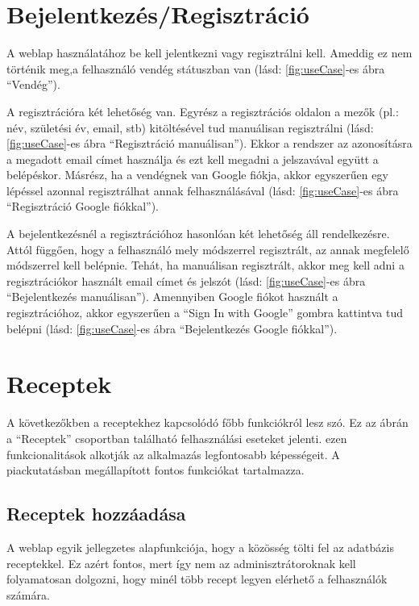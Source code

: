 \documentclass[12pt]{report}
\theoremstyle{definition}
\begin{document}
\section{Bejelentkezés/Regisztráció}
A weblap használatához be kell jelentkezni vagy regisztrálni kell. Ameddig ez nem történik meg,a felhasználó vendég státuszban van (lásd: \ref{fig:useCase}-es ábra “Vendég”). 

A regisztrációra két lehetőség van. Egyrész a regisztrációs oldalon a mezők (pl.: név, születési év, email, stb) kitöltésével tud manuálisan regisztrálni (lásd: \ref{fig:useCase}-es ábra “Regisztráció manuálisan”). Ekkor a rendszer az azonosításra a megadott email címet használja és ezt kell megadni a jelszavával együtt a belépéskor. Másrész, ha a vendégnek van Google fiókja, akkor egyszerűen egy lépéssel azonnal regisztrálhat annak felhasználásával (lásd: \ref{fig:useCase}-es ábra “Regisztráció Google fiókkal”).

A bejelentkezésnél a regisztrációhoz hasonlóan két lehetőség áll rendelkezésre. Attól függően, hogy a felhasználó mely módszerrel regisztrált, az annak megfelelő módszerrel kell belépnie. Tehát, ha manuálisan regisztrált, akkor meg kell adni a regisztrációkor használt email címet és jelszót (lásd: \ref{fig:useCase}-es ábra “Bejelentkezés manuálisan”). Amennyiben Google fiókot használt a regisztrációhoz, akkor egyszerűen a “Sign In with Google” gombra kattintva tud belépni (lásd: \ref{fig:useCase}-es ábra “Bejelentkezés Google fiókkal”).



\section{Receptek}
A következőkben a receptekhez kapcsolódó főbb funkciókról lesz szó. Ez az ábrán a “Receptek” csoportban található felhasználási eseteket jelenti. ezen funkcionalitások alkotják az alkalmazás legfontosabb képességeit. A piackutatásban megállapított fontos funkciókat tartalmazza.

\subsection{Receptek hozzáadása} 
A weblap egyik jellegzetes alapfunkciója, hogy a közösség tölti fel az adatbázis receptekkel. Ez azért fontos, mert így nem az adminisztrátoroknak kell folyamatosan dolgozni, hogy minél több recept legyen elérhető a felhasználók számára. 
\end{document}

